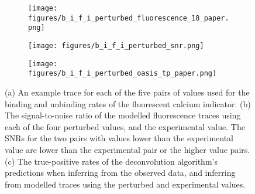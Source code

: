\documentclass[a4paper,12pt]{article}
\theoremstyle{definition}
\begin{document}
\begin{figure}[p]
\centering
    \begin{subfigure}{0.9\textwidth}
        \texttt{[image: figures/b\_i\_f\_i\_perturbed\_fluorescence\_18\_paper.png]}
        \caption{}
        \label{fig:rates_perturbed_fluorescence}
    \end{subfigure}
    \newline
    \begin{subfigure}{0.45\textwidth}
        \texttt{[image: figures/b\_i\_f\_i\_perturbed\_snr.png]}
        \caption{}
        \label{fig:rates_perturbed_snr}
    \end{subfigure}
    \begin{subfigure}{0.45\textwidth}
        \texttt{[image: figures/b\_i\_f\_i\_perturbed\_oasis\_tp\_paper.png]}
        \caption{}
        \label{fig:rates_perturbed_inference}
    \end{subfigure}
    \caption{(a) An example trace for each of the five pairs of values used for the binding and unbinding rates of the fluorescent calcium indicator. (b) The signal-to-noise ratio of the modelled fluorescence traces using each of the four perturbed values, and the experimental value. The SNRs for the two pairs with values lower than the experimental value are lower than the experimental pair or the higher value pairs. (c) The true-positive rates of the deconvolution algorithm's predictions when inferring from the observed data, and inferring from modelled traces using the perturbed and experimental values.}
    \label{fig:rates_perturbed}
\end{figure}
\end{document}

